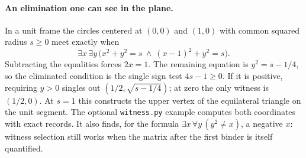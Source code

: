 \paragraph{An elimination one can see in the plane.}
In a unit frame the circles centered at $(0,0)$ and $(1,0)$ with common
squared radius $s\ge0$ meet exactly when
\[
  \exists x\,\exists y\,
  \bigl(x^2+y^2=s\ \land\ (x-1)^2+y^2=s\bigr).
\]
Subtracting the equalities forces $2x=1$. The remaining equation is
$y^2=s-1/4$, so the eliminated condition is the single sign test
$4s-1\ge0$. If it is positive, requiring $y>0$ singles out
$(1/2,\sqrt{s-1/4})$; at zero the only witness is $(1/2,0)$.
At $s=1$ this constructs the upper vertex of the equilateral triangle
on the unit segment. The optional \texttt{witness.py} example computes
both coordinates with exact records. It also finds, for the formula
$\exists x\,\forall y\,(y^2\ne x)$, a negative $x$: witness selection
still works when the matrix after the first binder is itself quantified.
